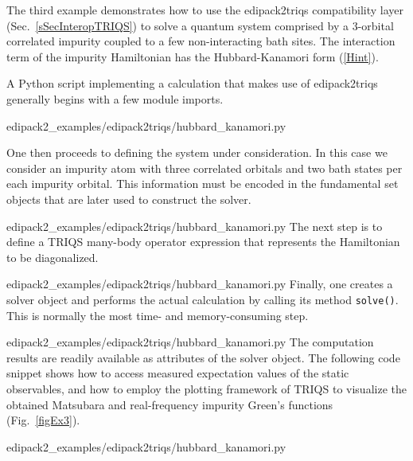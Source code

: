 \documentclass[edipack2.tex]{subfiles}
\begin{document}
The third example demonstrates how to use the edipack2triqs compatibility
layer (Sec.~\ref{sSecInteropTRIQS}) to solve a quantum system comprised by a
3-orbital correlated impurity coupled to a few non-interacting bath sites.
The interaction term of the impurity Hamiltonian has the Hubbard-Kanamori
form (\ref{Hint}).

\fixme{}


A Python script implementing a calculation that makes use of edipack2triqs
generally begins with a few module imports.

{edipack2_examples/edipack2triqs/hubbard_kanamori.py}

One then proceeds to defining the system under consideration. In this case we
consider an impurity atom with three correlated orbitals and two bath states
per each impurity orbital. This information must be encoded in the fundamental
set objects that are later used to construct the solver.

{edipack2_examples/edipack2triqs/hubbard_kanamori.py}
The next step is to define a TRIQS many-body operator expression that represents
the Hamiltonian to be diagonalized.

{edipack2_examples/edipack2triqs/hubbard_kanamori.py}
Finally, one creates a solver object and performs the actual calculation by
calling its method {\tt solve()}. This is normally the most time- and
memory-consuming step.

{edipack2_examples/edipack2triqs/hubbard_kanamori.py}
The computation results are readily available as attributes of the solver
object. The following code snippet shows how to access measured expectation
values of the static observables, and how to employ the plotting framework of
TRIQS to visualize the obtained Matsubara and real-frequency impurity Green's
functions (Fig.~\ref{figEx3}).

{edipack2_examples/edipack2triqs/hubbard_kanamori.py}
\end{document}
